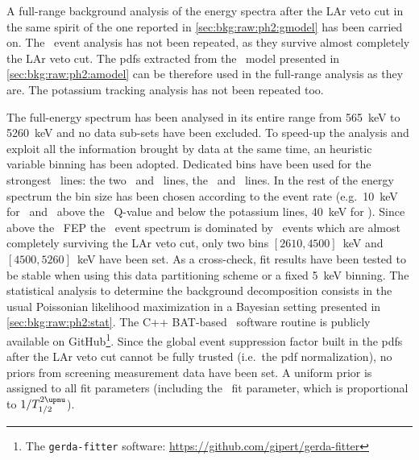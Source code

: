 A full-range background analysis of the energy spectra after the LAr veto cut in the same
spirit of the one reported in \cref{sec:bkg:raw:ph2:gmodel} has been carried on. The \a\
event analysis has not been repeated, as they survive almost completely the LAr veto cut.
The pdfs extracted from the \a\ model presented in \cref{sec:bkg:raw:ph2:amodel} can be
therefore used in the full-range analysis as they are. The potassium tracking analysis has
not been repeated too.

The full-energy spectrum has been analysed in its entire range from 565~keV to 5260~keV
and no data sub-sets have been excluded. To speed-up the analysis and exploit all the
information brought by data at the same time, an heuristic variable binning has been
adopted. Dedicated bins have been used for the strongest \g\ lines: the two \kvn\ and
\kvz\ lines, the \Bih\ and \Tl\ lines. In the rest of the energy spectrum the bin size has
been chosen according to the event rate (e.g.~10~keV for \enrBEGeII\ and \enrCoaxII{}bove
the \Arl\ Q-value and below the potassium lines, 40~keV for \enrGeII). Since above the
\Tl\ FEP the \Mone\ event spectrum is dominated by \a\ events which are almost completely
surviving the LAr veto cut, only two bins $[2610, 4500]$~keV and $[4500, 5260]$~keV have
been set. As a cross-check, fit results have been tested to be stable when using this
data partitioning scheme or a fixed 5~keV binning.
\newpar
The statistical analysis to determine the background decomposition consists in the usual
Poissonian likelihood maximization in a Bayesian setting presented in
\cref{sec:bkg:raw:ph2:stat}. The C++ BAT-based~\cite{Caldwell2008} software routine is
publicly available on GitHub\footnote{The \texttt{gerda-fitter} software:
\url{https://github.com/gipert/gerda-fitter}}. Since the global event suppression factor
built in the pdfs after the LAr veto cut cannot be fully trusted (i.e.~the pdf
normalization), no priors from screening measurement data have been set. \fillme{explain
this better maybe somewhere else?} A uniform prior
is assigned to all fit parameters (including the \nnbb\ fit parameter, which is
proportional to $1/\thalftwoM$).

